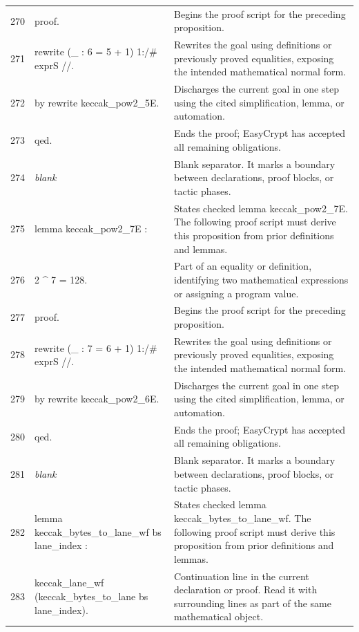 \documentclass[10pt]{article}
\begin{document}
\begin{longtable}{r L{0.53\textwidth} L{0.37\textwidth}}
270 & {\ttfamily\scriptsize proof.} & Begins the proof script for the preceding proposition. \\
271 & {\ttfamily\scriptsize rewrite (\_ : 6 = 5 + 1) 1:/\# exprS //.} & Rewrites the goal using definitions or previously proved equalities, exposing the intended mathematical normal form. \\
272 & {\ttfamily\scriptsize by rewrite keccak\_pow2\_5E.} & Discharges the current goal in one step using the cited simplification, lemma, or automation. \\
273 & {\ttfamily\scriptsize qed.} & Ends the proof; EasyCrypt has accepted all remaining obligations. \\
274 & {\ttfamily\scriptsize \emph{blank}} & Blank separator.  It marks a boundary between declarations, proof blocks, or tactic phases. \\
275 & {\ttfamily\scriptsize lemma keccak\_pow2\_7E :} & States checked lemma keccak\_pow2\_7E.  The following proof script must derive this proposition from prior definitions and lemmas. \\
276 & {\ttfamily\scriptsize   2 \textasciicircum{} 7 = 128.} & Part of an equality or definition, identifying two mathematical expressions or assigning a program value. \\
277 & {\ttfamily\scriptsize proof.} & Begins the proof script for the preceding proposition. \\
278 & {\ttfamily\scriptsize rewrite (\_ : 7 = 6 + 1) 1:/\# exprS //.} & Rewrites the goal using definitions or previously proved equalities, exposing the intended mathematical normal form. \\
279 & {\ttfamily\scriptsize by rewrite keccak\_pow2\_6E.} & Discharges the current goal in one step using the cited simplification, lemma, or automation. \\
280 & {\ttfamily\scriptsize qed.} & Ends the proof; EasyCrypt has accepted all remaining obligations. \\
281 & {\ttfamily\scriptsize \emph{blank}} & Blank separator.  It marks a boundary between declarations, proof blocks, or tactic phases. \\
282 & {\ttfamily\scriptsize lemma keccak\_bytes\_to\_lane\_wf bs lane\_index :} & States checked lemma keccak\_bytes\_to\_lane\_wf.  The following proof script must derive this proposition from prior definitions and lemmas. \\
283 & {\ttfamily\scriptsize   keccak\_lane\_wf (keccak\_bytes\_to\_lane bs lane\_index).} & Continuation line in the current declaration or proof.  Read it with surrounding lines as part of the same mathematical object. \\

\end{longtable}
\end{document}
